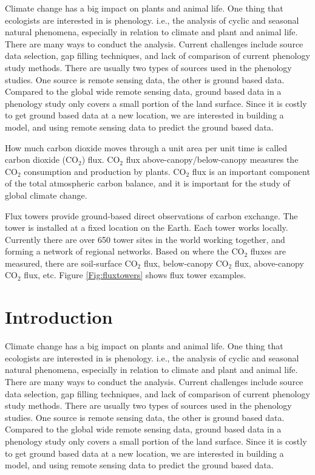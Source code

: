 \documentclass{article}
\begin{document}
Climate change has a big impact on plants and animal life. One thing that ecologists are interested in is phenology. i.e., the analysis of cyclic and seasonal natural phenomena, especially in relation to climate and plant and animal life. There are many ways to conduct the analysis. Current challenges include source data selection, gap filling techniques, and lack of comparison of current phenology study methods. There are usually two types of sources used in the phenology studies. One source is remote sensing data, the other is ground based data. Compared to the global wide remote sensing data, ground based data in a phenology study only covers a small portion of the land surface. Since it is costly to get ground based data at a new location, we are interested in building a model, and using remote sensing data to predict the ground based data.
 
How much carbon dioxide moves through a unit area per unit time is called carbon dioxide (CO$_2$) flux. 
CO$_2$ flux above-canopy/below-canopy measures the CO$_2$ consumption and production by plants.
CO$_2$ flux is an important component of the total atmospheric carbon balance, and it is important for the study of global climate change. 

Flux towers provide ground-based direct observations of carbon exchange. The tower is installed at a fixed location on the Earth.  Each tower works locally. Currently there are over 650 tower sites in the world working together, and forming a network of regional networks. 
Based on where the CO$_2$ fluxes are measured, there are soil-surface CO$_2$ flux, below-canopy CO$_2$ flux, above-canopy CO$_2$ flux, etc. Figure \ref{Fig:fluxtowers} shows flux tower examples.

\section{Introduction}

Climate change has a big impact on plants and animal life. One thing that ecologists are interested in is phenology. i.e., the analysis of cyclic and seasonal natural phenomena, especially in relation to climate and plant and animal life. There are many ways to conduct the analysis. Current challenges include source data selection, gap filling techniques, and lack of comparison of current phenology study methods. There are usually two types of sources used in the phenology studies. One source is remote sensing data, the other is ground based data. Compared to the global wide remote sensing data, ground based data in a phenology study only covers a small portion of the land surface. Since it is costly to get ground based data at a new location, we are interested in building a model, and using remote sensing data to predict the ground based data.
 
\end{document}
